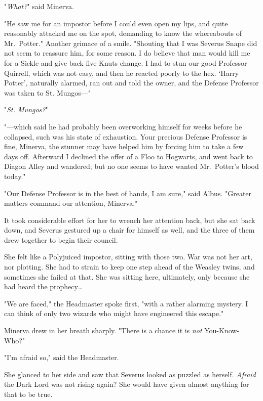 "\emph{What?}" said Minerva.

"He saw me for an impostor before I could even open my lips, and quite
reasonably attacked me on the spot, demanding to know the whereabouts of
Mr.~Potter." Another grimace of a smile. "Shouting that I was Severus Snape did
not seem to reassure him, for some reason. I do believe that man would kill me
for a Sickle and give back five Knuts change. I had to stun our good Professor
Quirrell, which was not easy, and then he reacted poorly to the hex. `Harry
Potter', naturally alarmed, ran out and told the owner, and the Defense
Professor was taken to St. Mungos---"

"\emph{St. Mungos?}"

"---which said he had probably been overworking himself for weeks before he
collapsed, such was his state of exhaustion. Your precious Defense Professor is
fine, Minerva, the stunner may have helped him by forcing him to take a few
days off. Afterward I declined the offer of a Floo to Hogwarts, and went back
to Diagon Alley and wandered; but no one seems to have wanted Mr.~Potter's
blood today."

"Our Defense Professor is in the best of hands, I am sure," said Albus.
"Greater matters command our attention, Minerva."

It took considerable effort for her to wrench her attention back, but she sat
back down, and Severus gestured up a chair for himself as well, and the three
of them drew together to begin their council.

She felt like a Polyjuiced impostor, sitting with those two. War was not her
art, nor plotting. She had to strain to keep one step ahead of the Weasley
twins, and sometimes she failed at that. She was sitting here, ultimately, only
because she had heard the prophecy{\ldots}

"We are faced," the Headmaster spoke first, "with a rather alarming mystery. I
can think of only two wizards who might have engineered this escape."

Minerva drew in her breath sharply. "There is a chance it is \emph{not}
You-Know-Who?"

"I'm afraid so," said the Headmaster.

She glanced to her side and saw that Severus looked as puzzled as herself.
\emph{Afraid} the Dark Lord was not rising again? She would have given almost
anything for that to be true.

